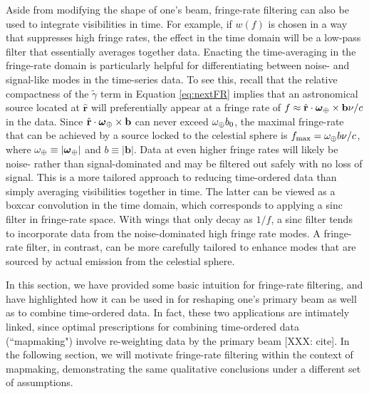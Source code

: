 \documentclass[twocolumn,apj,numberedappendix]{emulateapj}
\newcommand{\rhat}{\hat{\mathbf{r}}}
\begin{document}
Aside from modifying the shape of one's beam, fringe-rate filtering can also be used to integrate visibilities in time. For example, if $w(f)$ is chosen in a way that suppresses high fringe rates, the effect in the time domain will be a low-pass filter that essentially averages together data. Enacting the time-averaging in the fringe-rate domain is particularly helpful for differentiating between noise- and signal-like modes in the time-series data. To see this, recall that the relative compactness of the $\tilde{\gamma}$ term in Equation \eqref{eq:nextFR} implies that an astronomical source located at $\rhat$ will preferentially appear at a fringe rate of $f \approx \rhat \cdot \boldsymbol \omega_\Earth \times \mathbf{b} \nu / c $ in the data. Since $\rhat \cdot \boldsymbol \omega_\Earth \times \mathbf{b}$ can never exceed $\omega_\oplus b_0$, the maximal fringe-rate that can be achieved by a source locked to the celestial sphere is $f_\textrm{max} = \omega_\oplus b \nu / c$, where $\omega_\oplus \equiv | \boldsymbol \omega_\oplus|$ and $b \equiv | \mathbf{b}|$. Data at even higher fringe rates will likely be noise- rather than signal-dominated and may be filtered out safely with no loss of signal. This is a more tailored approach to reducing time-ordered data than simply averaging visibilities together in time. The latter can be viewed as a boxcar convolution in the time domain, which corresponds to applying a sinc filter in fringe-rate space. With wings that only decay as $1/f$, a sinc filter tends to incorporate data from the noise-dominated high fringe rate modes. A fringe-rate filter, in contrast, can be more carefully tailored to enhance modes that are sourced by actual emission from the celestial sphere.

In this section, we have provided some basic intuition for fringe-rate filtering, and have highlighted how it can be used in for reshaping one's primary beam as well as to combine time-ordered data. In fact, these two applications are intimately linked, since optimal prescriptions for combining time-ordered data (``mapmaking") involve re-weighting data by the primary beam [XXX: cite]. In the following section, we will motivate fringe-rate filtering within the context of mapmaking, demonstrating the same qualitative conclusions under a different set of assumptions.
\end{document}
